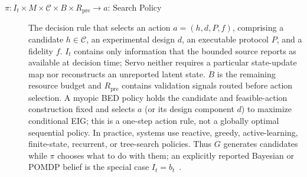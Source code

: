 \documentclass{article}
\begin{document}
\begin{description}
  \item[$\pi: I_t \times M \times \mathcal{C} \times B \times R_{\mathrm{pre}} \rightarrow a$: Search Policy] The decision rule that selects an action $a=(h,d,P,f)$, comprising a candidate $h\in\mathcal C$, an experimental design $d$, an executable protocol $P$, and a fidelity $f$. $I_t$ contains only information that the bounded source reports as available at decision time; Servo neither requires a particular state-update map nor reconstructs an unreported latent state. $B$ is the remaining resource budget and $R_{\mathrm{pre}}$ contains validation signals routed before action selection. A myopic BED policy holds the candidate and feasible-action construction fixed and selects $a$ (or its design component $d$) to maximize conditional EIG; this is a one-step action rule, not a globally optimal sequential policy. In practice, systems use reactive, greedy, active-learning, finite-state, recurrent, or tree-search policies. Thus $G$ generates candidates while $\pi$ chooses what to do with them; an explicitly reported Bayesian or POMDP belief is the special case $I_t=b_t$~\citep{kaelbling1998pomdp}.
\end{description}
\end{document}
